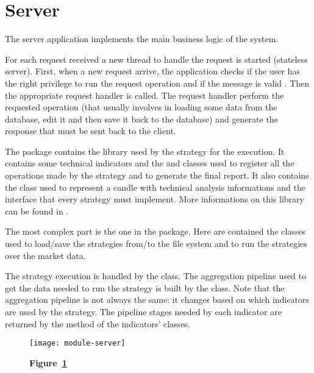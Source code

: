 \section{Server}\label{sec:server}

The server application implements the main business logic of the system.

For each request received a new thread to handle the request is started
(stateless server). First, when a new request arrive, the application checks if
the user has the right privilege to run the request operation and if the message
is valid . Then the appropriate
request handler is called. The request handler perform the requested operation
(that usually involves in loading some data from the database, edit it and then
save it back to the database) and generate the response that must be sent back
to the client.

The  package contains the library used by the strategy for the
execution. It contains some technical indicators and the  and
 classes used to register all the operations made by the strategy
and to generate the final report. It also contains the  class used
to represent a candle with technical analysis informations and the
 interface that every strategy must implement. More
informations on this library can be found in .

The most complex part is the one in the  package. Here
are contained the classes used to load/save the strategies from/to the file
system and to run the strategies over the market data.

The strategy execution is handled by the  class. The
aggregation pipeline used to get the data needed to run the strategy is built by
the  class. Note that the aggregation pipeline is not
always the same: it changes based on which indicators are used by the strategy.
The pipeline stages needed by each indicator are returned by the
 method of the indicators' classes.

\begin{landscape}
	\begin{figure}[!h]
		\texttt{[image: module-server]}
		\caption*{\textbf{Figure~\ref{fig:server}}}
		\captionlistentry{}\label{fig:server}
	\end{figure}
\end{landscape}
